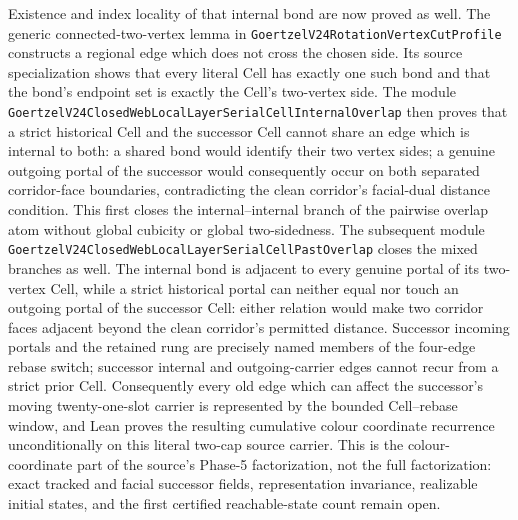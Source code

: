 \documentclass[11pt]{article}
\theoremstyle{definition}
\begin{document}
Existence and index locality of that internal bond are now proved as well.
The generic connected-two-vertex lemma in
\texttt{GoertzelV24RotationVertexCutProfile} constructs a regional edge which
does not cross the chosen side.  Its source specialization shows that every
literal Cell has exactly one such bond and that the bond's endpoint set is
exactly the Cell's two-vertex side.  The module
\texttt{GoertzelV24ClosedWebLocalLayerSerialCellInternalOverlap} then proves
that a strict historical Cell and the successor Cell cannot share an edge
which is internal to both: a shared bond would identify their two vertex
sides; a genuine outgoing portal of the successor would consequently occur on
both separated corridor-face boundaries, contradicting the clean corridor's
facial-dual distance condition.  This first closes the internal--internal
branch of the pairwise overlap atom without global cubicity or global
two-sidedness.  The subsequent module
\texttt{GoertzelV24ClosedWebLocalLayerSerialCellPastOverlap} closes the mixed
branches as well.  The internal bond is adjacent to every genuine portal of
its two-vertex Cell, while a strict historical portal can neither equal nor
touch an outgoing portal of the successor Cell: either relation would make
two corridor faces adjacent beyond the clean corridor's permitted distance.
Successor incoming portals and the retained rung are precisely named members
of the four-edge rebase switch; successor internal and outgoing-carrier edges
cannot recur from a strict prior Cell.  Consequently every old edge which can
affect the successor's moving twenty-one-slot carrier is represented by the
bounded Cell--rebase window, and Lean proves the resulting cumulative colour
coordinate recurrence unconditionally on this literal two-cap source
carrier.  This is the colour-coordinate part of the source's Phase-5
factorization, not the full factorization: exact tracked and facial successor
fields, representation invariance, realizable initial states, and the first
certified reachable-state count remain open.
\end{document}
